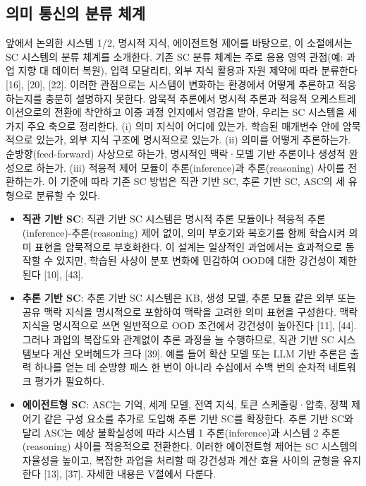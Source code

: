 \subsection{의미 통신의 분류 체계}
앞에서 논의한 시스템 1/2, 명시적 지식, 에이전트형 제어를 바탕으로, 이 소절에서는 SC 시스템의 분류 체계를 소개한다. 기존 SC 분류 체계는 주로 응용 영역 관점(예: 과업 지향 대 데이터 복원), 입력 모달리티, 외부 지식 활용과 자원 제약에 따라 분류한다 [16], [20], [22]. 이러한 관점으로는 시스템이 변화하는 환경에서 어떻게 추론하고 적응하는지를 충분히 설명하지 못한다. 암묵적 추론에서 명시적 추론과 적응적 오케스트레이션으로의 전환에 착안하고 이중 과정 인지에서 영감을 받아, 우리는 SC 시스템을 세 가지 주요 축으로 정리한다. (i) 의미 지식이 어디에 있는가. 학습된 매개변수 안에 암묵적으로 있는가, 외부 지식 구조에 명시적으로 있는가. (ii) 의미를 어떻게 추론하는가. 순방향(feed-forward) 사상으로 하는가, 명시적인 맥락·모델 기반 추론이나 생성적 완성으로 하는가. (iii) 적응적 제어 모듈이 추론(inference)과 추론(reasoning) 사이를 전환하는가. 이 기준에 따라 기존 SC 방법은 직관 기반 SC, 추론 기반 SC, ASC의 세 유형으로 분류할 수 있다.
\begin{itemize}
\item \textbf{직관 기반 SC}: 직관 기반 SC 시스템은 명시적 추론 모듈이나 적응적 추론(inference)-추론(reasoning) 제어 없이, 의미 부호기와 복호기를 함께 학습시켜 의미 표현을 암묵적으로 부호화한다. 이 설계는 일상적인 과업에서는 효과적으로 동작할 수 있지만, 학습된 사상이 분포 변화에 민감하여 OOD에 대한 강건성이 제한된다 [10], [43].
\item \textbf{추론 기반 SC}: 추론 기반 SC 시스템은 KB, 생성 모델, 추론 모듈 같은 외부 또는 공유 맥락 지식을 명시적으로 포함하여 맥락을 고려한 의미 표현을 구성한다. 맥락 지식을 명시적으로 쓰면 일반적으로 OOD 조건에서 강건성이 높아진다 [11], [44]. 그러나 과업의 복잡도와 관계없이 추론 과정을 늘 수행하므로, 직관 기반 SC 시스템보다 계산 오버헤드가 크다 [39]. 예를 들어 확산 모델 또는 LLM 기반 추론은 출력 하나를 얻는 데 순방향 패스 한 번이 아니라 수십에서 수백 번의 순차적 네트워크 평가가 필요하다.
\item \textbf{에이전트형 SC}: ASC는 기억, 세계 모델, 전역 지식, 토큰 스케줄링·압축, 정책 제어기 같은 구성 요소를 추가로 도입해 추론 기반 SC를 확장한다. 추론 기반 SC와 달리 ASC는 예상 불확실성에 따라 시스템 1 추론(inference)과 시스템 2 추론(reasoning) 사이를 적응적으로 전환한다. 이러한 에이전트형 제어는 SC 시스템의 자율성을 높이고, 복잡한 과업을 처리할 때 강건성과 계산 효율 사이의 균형을 유지한다 [13], [37]. 자세한 내용은 V절에서 다룬다.
\end{itemize}

